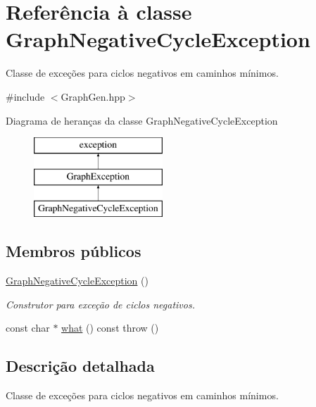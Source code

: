 \hypertarget{classGraphNegativeCycleException}{}\section{Referência à classe Graph\+Negative\+Cycle\+Exception}
\label{classGraphNegativeCycleException}


Classe de exceções para ciclos negativos em caminhos mínimos.  




{\ttfamily \#include $<$Graph\+Gen.\+hpp$>$}

Diagrama de heranças da classe Graph\+Negative\+Cycle\+Exception\begin{figure}[H]
\begin{center}
\leavevmode
\includegraphics[height=3.000000cm]{classGraphNegativeCycleException}
\end{center}
\end{figure}
\subsection*{Membros públicos}
\begin{DoxyCompactItemize}
\item 
\mbox{\label{classGraphNegativeCycleException_ae4862d8b8e61233ff35331fbe188f98d}} 
\hyperlink{classGraphNegativeCycleException_ae4862d8b8e61233ff35331fbe188f98d}{Graph\+Negative\+Cycle\+Exception} ()
\begin{DoxyCompactList}\small\item\em Construtor para exceção de ciclos negativos. \end{DoxyCompactList}\item 
const char $\ast$ \hyperlink{classGraphNegativeCycleException_ae973328a57ec48ac66298365bfe7ded4}{what} () const  throw ()
\end{DoxyCompactItemize}


\subsection{Descrição detalhada}
Classe de exceções para ciclos negativos em caminhos mínimos. 

